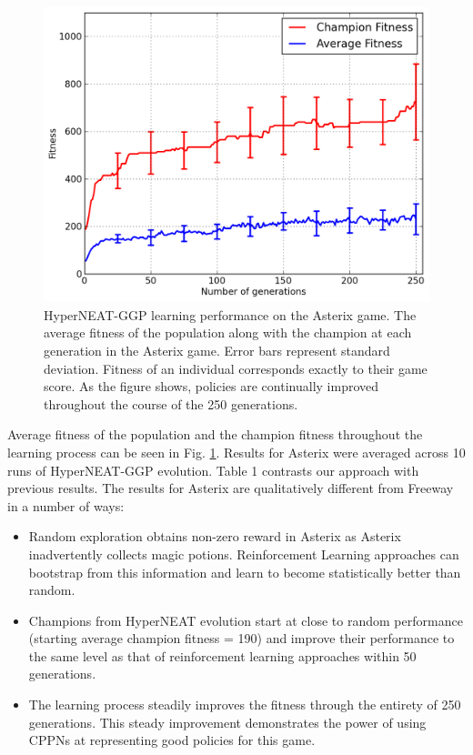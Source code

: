 \documentclass{acm_proc_article-sp}
\begin{document}
\begin{figure}[ht]
\begin{center}
\includegraphics[width=\columnwidth]{figures/asterix-results.png}
\end{center}
\caption{HyperNEAT-GGP learning performance on the Asterix game. The average fitness of the population along with the champion at each generation in the Asterix game. Error bars represent standard deviation. Fitness of an individual corresponds exactly to their game score. As the figure shows, policies are continually improved throughout the course of the 250 generations.}
\label{fig:asterix-curve}
\end{figure}

Average fitness of the population and the champion fitness throughout the learning process can be seen in Fig. \ref{fig:asterix-curve}. Results for Asterix were averaged across 10 runs of HyperNEAT-GGP evolution. Table 1 contrasts our approach with previous results. The results for Asterix are qualitatively different from Freeway in a number of ways:
\begin{itemize}
\item
Random exploration obtains non-zero reward in Asterix as Asterix inadvertently collects magic potions. Reinforcement Learning approaches can bootstrap from this information and learn to become statistically better than random.
\item
Champions from HyperNEAT evolution start at close to random performance (starting average champion fitness = 190) and improve their performance to the same level as that of reinforcement learning approaches within 50 generations. 
\item
The learning process steadily improves the fitness through the entirety of 250 generations. This steady improvement demonstrates the power of using CPPNs at representing good policies for this game.
\end{itemize}
\end{document}
